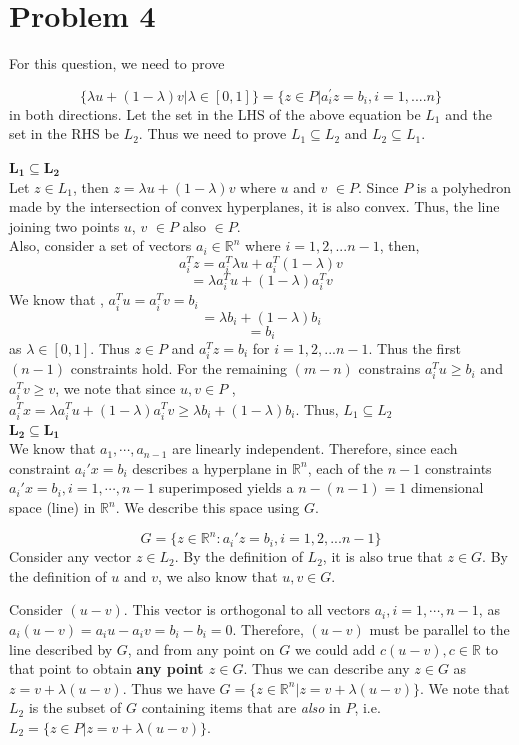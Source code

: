 \documentclass[11pt]{article}
\begin{document}
\section*{Problem 4}
For this question, we need to prove

\[ \{\lambda u + (1-\lambda) v | \lambda \in [0,1] \} = \{z \in P | a_{i}^{'}z =  b_i, i = 1,....n\} \]
in both directions. Let the set in the LHS of the above equation be $L_1$ and the set in the RHS be $L_2$. Thus we need to prove $L_1 \subseteq L_2$ and $L_2 \subseteq L_1$. 

\underline{$\mathbf{L_1 \subseteq L_2}$} \\

Let $z \in L_1$, then $z = \lambda u + (1 - \lambda) v$ where $u$ and $v$ $\in P$. Since $P$ is a polyhedron made by the intersection of convex hyperplanes, it is also convex. Thus, the line joining two points $u$, $v$ $\in P$ also $\in P$. \\
Also, consider a set of vectors $a_i \in \mathbb{R}^n$ where $i = 1,2,...n-1$, then, 
\[ a_{i}^T z = a_{i}^T \lambda u + a_{i}^T (1 - \lambda)v \]
\[ = \lambda a_{i}^T u + (1-\lambda)a_{i}^T v\] 
We know that , $a_{i}^T u = a_{i}^T v = b_i$ \\
\[ = \lambda b_i + (1-\lambda) b_i\]
\[ = b_i \]
as $\lambda \in [0,1]$. Thus $z \in P$ and $a_{i}^T z = b_i$ for $i=1,2,...n-1$. Thus the first $(n-1)$ constraints hold. For the remaining $(m-n)$ constrains $a_{i}^T u \ge b_i$ and $a_{i}^T v \ge v$, we note that since $u,v \in P$ , $a_{i}^T x = \lambda a_{i}^T u + (1 - \lambda) a_{i}^T v \ge \lambda b_i + (1-\lambda) b_i$. Thus, $L_1 \subseteq L_2$\\

\underline{$\mathbf{L_2 \subseteq L_1}$} \\

We know that $a_1,\cdots,a_{n-1}$ are linearly independent. Therefore, since each constraint $a_i'x=b_i$ describes a hyperplane in $\mathbb{R}^n$, each of the $n-1$ constraints $a_i'x=b_i, i=1,\cdots, n-1$ superimposed yields a $n-(n-1)=1$ dimensional space (line) in $\mathbb{R}^n$. We describe this space using $G$.

$$
G = \{ z \in \mathbb{R}^n : a_{i}' z = b_i, i = 1,2,...n-1\}
$$
Consider any vector $z\in L_2$. By the definition of $L_2$, it is also true that $z\in G$. By the definition of $u$ and $v$, we also know that $u,v\in G$.

Consider $(u-v)$. This vector is orthogonal to all vectors $a_i, i=1,\cdots, n-1$, as $a_i(u-v)=a_iu-a_iv=b_i-b_i=0$. Therefore, $(u-v)$ must be parallel to the line described by $G$, and from any point on $G$ we could add $c(u-v), c\in\mathbb{R}$ to that point to obtain \textbf{any point $z\in G$}. Thus we can describe any $z\in G$ as $z=v+\lambda(u-v)$. Thus we have $G=\{z\in\mathbb{R}^n|z=v+\lambda(u-v)\}$. We note that $L_2$ is the subset of $G$ containing items that are \emph{also} in $P$, i.e. $L_2=\{z\in P|z=v+\lambda(u-v)\}$. \\
\end{document}
